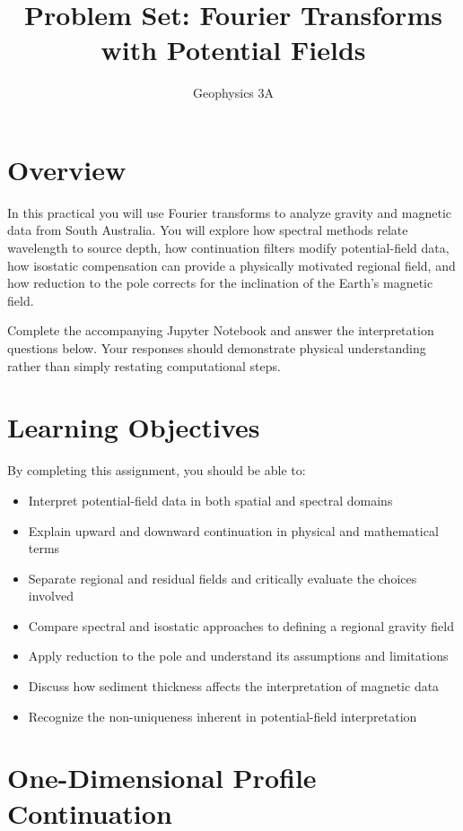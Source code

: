 \documentclass[11pt]{article}
\title{Problem Set: Fourier Transforms with Potential Fields}
\author{Geophysics 3A}
\date{}
\begin{document}
\maketitle

\section*{Overview}

In this practical you will use Fourier transforms to analyze gravity and magnetic
data from South Australia.  You will explore how spectral methods relate wavelength
to source depth, how continuation filters modify potential-field data, how
isostatic compensation can provide a physically motivated regional field, and how
reduction to the pole corrects for the inclination of the Earth's magnetic field.

Complete the accompanying Jupyter Notebook and answer the interpretation questions
below.  Your responses should demonstrate physical understanding rather than simply
restating computational steps.

\section*{Learning Objectives}

By completing this assignment, you should be able to:
\begin{itemize}
  \item Interpret potential-field data in both spatial and spectral domains
  \item Explain upward and downward continuation in physical and mathematical terms
  \item Separate regional and residual fields and critically evaluate the choices involved
  \item Compare spectral and isostatic approaches to defining a regional gravity field
  \item Apply reduction to the pole and understand its assumptions and limitations
  \item Discuss how sediment thickness affects the interpretation of magnetic data
  \item Recognize the non-uniqueness inherent in potential-field interpretation
\end{itemize}

\section{One-Dimensional Profile Continuation}
\end{document}
